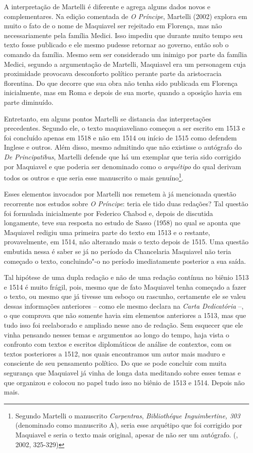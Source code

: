 A interpretação de Martelli é diferente e agrega alguns dados novos e
complementares. Na edição comentada de \emph{O Príncipe}, Martelli
(2002) explora em muito o fato de o nome de Maquiavel ser rejeitado em
Florença, mas não necessariamente pela família Medici. Isso impediu que
durante muito tempo seu texto fosse publicado e ele mesmo pudesse
retornar ao governo, então sob o comando da família. Mesmo sem ser
considerado um inimigo por parte da família Medici, segundo a
argumentação de Martelli, Maquiavel era um personagem cuja proximidade
provocava desconforto político perante parte da aristocracia florentina.
Do que decorre que sua obra não tenha sido publicada em Florença
inicialmente, mas em Roma e depois de sua morte, quando a oposição havia
em parte diminuído.

Entretanto, em alguns pontos Martelli se distancia das interpretações
precedentes. Segundo ele, o texto maquiaveliano começou a ser escrito em
1513 e foi concluído apenas em 1518 e não em 1514 ou início de 1515 como
defendem Inglese e outros. Além disso, mesmo admitindo que não existisse
o autógrafo do \emph{De Principatibus}, Martelli defende que há um
exemplar que teria sido corrigido por Maquiavel e que poderia ser
denominado como o \emph{arquétipo} do qual derivam todos os outros e que
seria esse manuscrito o mais genuíno\footnote{Segundo Martelli o
  manuscrito \emph{Carpentras}, \emph{Bibliothéque Inguimbertine, 303}
  (denominado como manuscrito A), seria esse arquétipo que foi corrigido
  por Maquiavel e seria o texto mais original, apesar de não ser um
  autógrafo. (, 2002, 325-329)}.

Esses elementos invocados por Martelli nos remetem à já mencionada
questão recorrente nos estudos sobre \emph{O Príncipe}: teria ele tido
duas redações? Tal questão foi formulada inicialmente por Federico
Chabod e, depois de discutida longamente, teve sua resposta no estudo de
Sasso (1958) no qual se aponta que Maquiavel redigiu uma primeira parte
do texto em 1513 e o restante, provavelmente, em 1514, não alterando
mais o texto depois de 1515. Uma questão embutida nessa é saber se já no
período da Chancelaria Maquiavel não teria começado o texto,
concluindo"-o no período imediatamente posterior a sua saída.

Tal hipótese de uma dupla redação e não de uma redação contínua no
biênio 1513 e 1514 é muito frágil, pois, mesmo que de fato Maquiavel
tenha começado a fazer o texto, ou mesmo que já tivesse um esboço ou
rascunho, certamente ele se valeu dessas informações anteriores -- como
ele mesmo declara na \emph{Carta Dedicatória} --, o que comprova que não
somente havia sim elementos anteriores a 1513, mas que tudo isso foi
reelaborado e ampliado nesse ano de redação. Sem esquecer que ele vinha
pensando nesses temas e argumentos ao longo do tempo, haja vista o
confronto com textos e escritos diplomáticos de análise de contextos,
com os textos posteriores a 1512, nos quais encontramos um autor mais
maduro e consciente de seu pensamento político. Do que se pode concluir
com muita segurança que Maquiavel já vinha de longa data meditando sobre
esses temas e que organizou e colocou no papel tudo isso no biênio de
1513 e 1514. Depois não mais.

